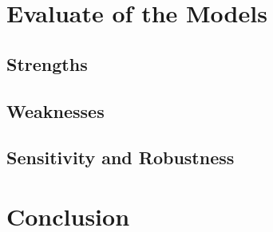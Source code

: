 \section{Evaluate of the Models}
\subsection{Strengths}

\subsection{Weaknesses}

\subsection{Sensitivity and Robustness}
\section{Conclusion}




